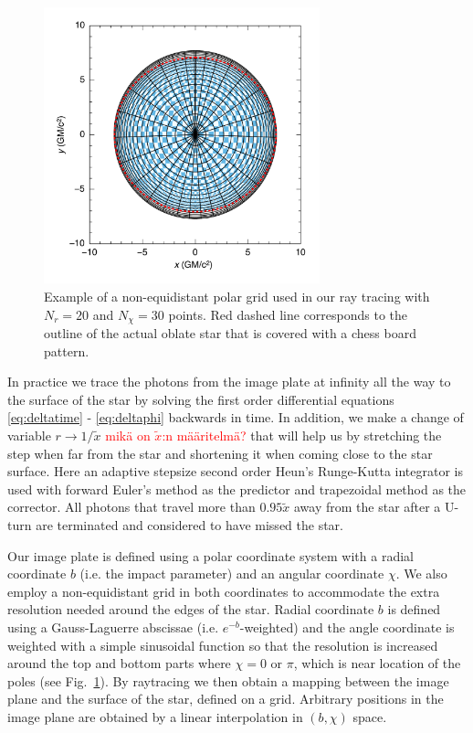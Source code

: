 \documentclass[iop, usenatbib]{emulateapj}
\newcommand{\red}[1]{\textcolor{red}{#1}}
\begin{document}
\begin{figure}
\centering
\includegraphics[width=8cm]{figs/fig6a.pdf}
\caption{\label{fig:grid}
Example of a non-equidistant polar grid used in our ray tracing with $N_r = 20$ and $N_{\chi} = 30$ points.
Red dashed line corresponds to the outline of the actual oblate star that is covered with a chess board pattern.
}
\end{figure}


In practice we trace the photons from the image plate at infinity all
the way to the surface of the star by solving the first order
differential equations \eqref{eq:deltatime} - \eqref{eq:deltaphi}
backwards in time.  In addition, we make a change of variable $r
\rightarrow 1/\tilde{x}$ \red{mikä on $\tilde{x}$:n määritelmä?} that will help us by stretching the step when
far from the star and shortening it when coming close to the star
surface.  Here an adaptive stepsize second order Heun's Runge-Kutta
integrator is used with forward Euler's method as
the predictor and trapezoidal method as the corrector.  
All photons that travel
more than $0.95\tilde{x}$ away from the star after a U-turn are
terminated and considered to have missed the star.

Our image plate is defined using a polar coordinate system with a radial
coordinate $b$ (i.e. the impact parameter) and an angular coordinate $\chi$.
We also employ a non-equidistant grid in both coordinates to accommodate
the extra resolution needed around the edges of the star.  Radial
coordinate $b$ is defined using a Gauss-Laguerre abscissae (i.e.
$e^{-b}$-weighted) and the angle coordinate is weighted with a simple
sinusoidal function so that the resolution is increased around the top
and bottom parts where $\chi = 0$ or $\pi$, which is near location of the poles
(see Fig.~\ref{fig:grid}).  By raytracing we then obtain
a mapping between the image plane and the surface of the star, defined
on a grid.
Arbitrary positions in the image plane are 
obtained by a linear interpolation in $(b, \chi)$ space.
\end{document}
